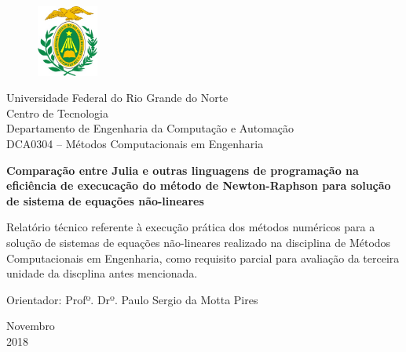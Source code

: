 \documentclass[a4paper, 12pt, openright, oneside]{article}
\begin{document}
\begin{titlepage}
	\begin{center}
	
	\begin{figure}[!ht]
	\centering
	\includegraphics[width=2cm]{./ufrn.jpg}
	\end{figure}

		Universidade Federal do Rio Grande do Norte\\
		Centro de Tecnologia\\
		Departamento de Engenharia da Computação e Automação\\
		DCA0304 -- Métodos Computacionais em Engenharia\\
\vspace{15pt}
        
        \vspace{85pt}
        
		\textbf{\large{Comparação entre Julia e outras linguagens de programação na eficiência de execucação do método de Newton-Raphson para solução de sistema de equações não-lineares}}\\
			
	\end{center}
\vspace{1,5cm}
	
	\begin{flushright}

   \begin{list}{}{
      \setlength{\leftmargin}{4.5cm}
      \setlength{\rightmargin}{0cm}
      \setlength{\labelwidth}{0pt}
      \setlength{\labelsep}{\leftmargin}}

      \item Relatório técnico referente à execução prática dos métodos numéricos para a solução de sistemas de equações não-lineares realizado na disciplina de Métodos Computacionais em Engenharia, como requisito parcial para avaliação da terceira unidade da discplina antes mencionada.

      \begin{list}{}{
      \setlength{\leftmargin}{0cm}
      \setlength{\rightmargin}{0cm}
      \setlength{\labelwidth}{0pt}
      \setlength{\labelsep}{\leftmargin}}


            \item Orientador: Profº. Drº. Paulo Sergio da Motta Pires

      \end{list}
   \end{list}
\end{flushright}
\vspace{1cm}
\begin{center}
		\vspace{\fill}
		 Novembro\\2018
			\end{center}
\end{titlepage}
\end{document}
